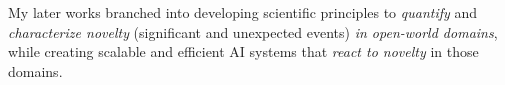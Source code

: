 My later works branched into developing 
scientific principles to \textit{quantify} and \textit{characterize novelty} (significant and unexpected events) \textit{in open-world domains}, while creating scalable and efficient AI systems that \textit{react to novelty }in those domains.

